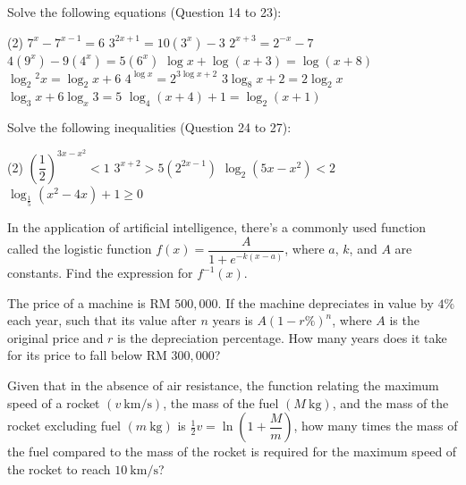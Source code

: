 \documentclass{report}
\begin{document}
			\noindent Solve the following equations (Question 14 to 23):
			\begin{tasks}[label=\arabic*.,resume](2)
				\task $7^x-7^{x-1}=6$
				\task $3^{2 x+1}=10\left(3^x\right)-3$
				\task $2^{x+3}=2^{-x}-7$
				\task $4\left(9^x\right)-9\left(4^x\right)=5\left(6^x\right)$
				\task $\log x+\log (x+3)=\log (x+8)$
				\task $\log _2{ }^2 x=\log _2 x+6$
				\task $4^{\log x}=2^{3 \log x+2}$
				\task $3 \log _8 x+2=2 \log _2 x$
				\task $\log _3 x+6 \log _x 3=5$
				\task $\log _4(x+4)+1=\log _2(x+1)$
			\end{tasks}
			
			Solve the following inequalities (Question 24 to 27):
			\begin{tasks}[label=\arabic*.,resume](2)
				\task $\left(\dfrac{1}{2}\right)^{3 x-x^2}<1$
				\task $3^{x+2}>5\left(2^{2 x-1}\right)$
				\task $\log _2\left(5 x-x^2\right)<2$
				\task $\log _{\frac{1}{5}}\left(x^2-4 x\right)+1 \geq 0$
			\end{tasks}
			\begin{tasks}[label=\arabic*., resume]
				\task In the application of artificial intelligence, there's a commonly used function called the logistic function $f(x)=\dfrac{A}{1+e^{-k(x-a)}}$, where $a$, $k$, and $A$ are constants. Find the expression for $f^{-1}(x)$.
				
				\task The price of a machine is RM $500,000$. If the machine depreciates in value by $4\%$ each year, such that its value after $n$ years is $A(1-r\%)^n$, where $A$ is the original price and $r$ is the depreciation percentage. How many years does it take for its price to fall below RM $300,000$?
				            
				\task Given that in the absence of air resistance, the function relating the maximum speed of a rocket $(v \mathrm{~km} / \mathrm{s})$, the mass of the fuel $(M \mathrm{~kg})$, and the mass of the rocket excluding fuel $(m \mathrm{~kg})$ is $\frac{1}{2} v=\ln \left(1+\dfrac{M}{m}\right)$, how many times the mass of the fuel compared to the mass of the rocket is required for the maximum speed of the rocket to reach $10 \mathrm{~km} / \mathrm{s}$?
			\end{tasks}
\end{document}
